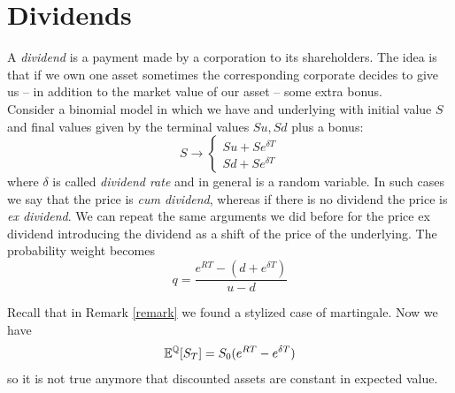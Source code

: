 \section{Dividends}
A \emph{dividend} is a payment made by a corporation to its shareholders. The idea is that if we own one asset sometimes the corresponding corporate decides to give us -- in addition to the market value of our asset -- some extra bonus. \\
Consider a binomial model in which we have and underlying with initial value $S$ and final values given by the terminal values $Su,Sd$ plus a bonus:
\begin{equation}
    S \to \begin{cases}
    Su + Se^{\delta T} \\ Sd + Se^{\delta T}
    \end{cases}
\end{equation}
where $\delta$ is called \emph{dividend rate} and in general is a random variable. In such cases we say that the price is \emph{cum dividend}, whereas if there is no dividend the price is \emph{ex dividend}. We can repeat the same arguments we did before for the price ex dividend introducing the dividend as a shift of the price of the underlying. The probability weight becomes
\begin{equation}
    q = \dfrac{e^{RT}-(d+e^{\delta T})}{u-d}
\end{equation}
\begin{remark}
    Recall that in Remark \ref{remark} we found a stylized case of martingale. Now we have
    \begin{equation}
        \mathbb{E}^{\mathbb{Q}}[S_T] = S_0(e^{RT}-e^{\delta T})
    \end{equation}
    so it is not true anymore that discounted assets are constant in expected value.
\end{remark}

